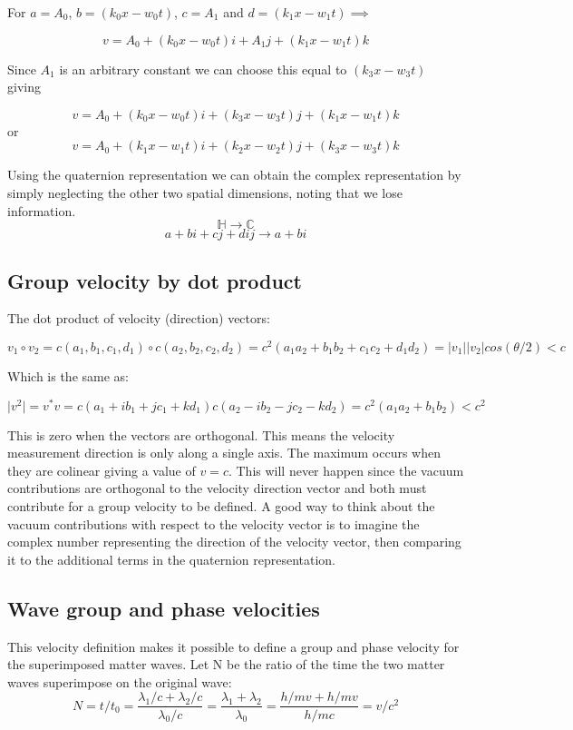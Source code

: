 \documentclass{article}
\begin{document}
For $a=A_0$, $b=(k_0 x-w_0t)$, $c=A_1$ and $d=(k_1 x-w_1t) \implies$

$$v=A_0+(k_0 x-w_0t)i+A_1j+(k_1 x-w_1t)k$$

Since $A_1$ is an arbitrary constant we can choose this equal to $(k_3 x-w_3t)$ giving 

$$v=A_0+(k_0 x-w_0t)i+(k_3 x-w_3t)j+(k_1 x-w_1t)k$$
or
$$v=A_0+(k_1 x-w_1t)i+(k_2 x-w_2t)j+(k_3 x-w_3t)k$$

Using the quaternion representation we can obtain the complex representation by simply neglecting the other two spatial dimensions, noting that we lose information.
$$\mathbb{H} \rightarrow \mathbb{C}$$
$$a+bi+cj+dij \rightarrow a+bi$$

\subsection{Group velocity by dot product}

The dot product of velocity (direction) vectors:

$$v_1 \circ v_2=c(a_1, b_1, c_1, d_1)\circ c(a_2, b_2, c_2, d_2)=c^2(a_1 a_2 + b_1 b_2 + c_1 c_2 + d_1 d_2)=\lvert v_1 \rvert \lvert v_2 \rvert cos(\theta /2)<c$$

Which is the same as:

$$\lvert v^2 \rvert =v^*v=c(a_1+ib_1+jc_1+kd_1)c(a_2-ib_2-jc_2-kd_2)=c^2(a_1 a_2+b_1 b_2)<c^2$$

This is zero when the vectors are orthogonal. This means the velocity measurement direction is only along a single axis. The maximum occurs when they are colinear giving a value of $v=c$. This will never happen since the vacuum contributions are orthogonal to the velocity direction vector and both must contribute for a group velocity to be defined. A good way to think about the vacuum contributions with respect to the velocity vector is to imagine the complex number representing the direction of the velocity vector, then comparing it to the additional terms in the quaternion representation.\\

\subsection{Wave group and phase velocities}
This velocity definition makes it possible to define a group and phase velocity for the superimposed matter waves. Let N be the ratio of the time the two matter waves superimpose on the original wave:
$$N=t/t_0=\frac{\lambda_1/c+\lambda_2/c}{\lambda_0/c}=\frac{\lambda_1+\lambda_2}{\lambda_0}=\frac{h/mv+h/mv}{h/mc}=v/c^2$$
\end{document}
